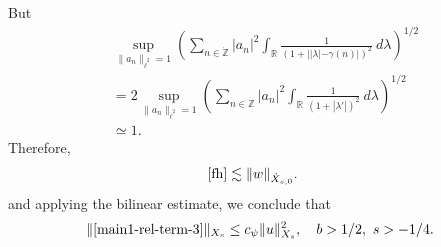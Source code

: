 \documentclass[12pt,reqno]{amsart}
\numberwithin{equation}{section}  %
\renewcommand{\cref}{\Cref}
\newcommand{\rr}{\mathbb{R}}
\newcommand{\zz}{\mathbb{Z}}
\newcommand{\zzdot}{\dot{\zz}}
\begin{document}
%
But
\begin{equation*}
	\begin{split}
	  &  \sup_{\|a_{n}\|_{\dot{\ell}^{2}}=1}\left( \sum_{n \in \zzdot} | a_{n} |^2\int_{\rr} \frac{1}{\left( 1 + | |\lambda| -
		\gamma(n) | \right)^{2 }} \ d \lambda  
		\right)^{1/2} 
		\\
		& = 2 \sup_{\|a_{n}\|_{\dot{\ell}^{2}}=1}\left ( \sum_{n \in \zzdot}
		| a_n |^2 
		\int_{\rr} \frac{1}{\left( 1 + | \lambda' | \right)^{2}} \ d 
		\lambda \right)^{1/2}
		\\
		& \simeq 1.
		\end{split}
\end{equation*}
%
Therefore,
%
%
\begin{equation*}
\begin{split}
  \cref{fh}
  & \lesssim \|  w \|_{\dot{X}_{s, 0}}.
\end{split}
\end{equation*}
%
%
and applying the bilinear estimate, we conclude that 
%
%
\begin{equation}
  \label{main-int3-est}
	\begin{split}
    \|\cref{main1-rel-term-3}\|_{X_{s}} \le c_{\psi} 
     \|u\|^{2}_{X_{s}}, \quad  b > 1/2,  \ s > -1/4.
	\end{split}
\end{equation}

%
%
%
\end{document}
